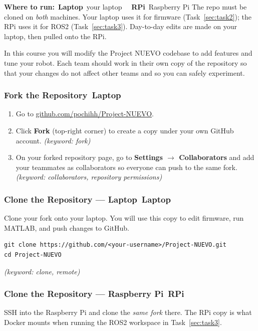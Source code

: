 \documentclass{ol-softwaremanual}
\newcommand{\onlaptop}{%
  \,\colorbox{green!25}{\footnotesize\sffamily\bfseries Laptop}}
\newcommand{\onrpi}{%
  \,\colorbox{blue!20}{\footnotesize\sffamily\bfseries RPi}}
\newcommand{\machinebox}[2]{%
  \par\noindent
  \colorbox{gray!12}{\parbox{\dimexpr\linewidth-2\fboxsep}{%
    \small\sffamily\textbf{Where to run:} #1 \quad\textbar\quad #2}}%
  \par\smallskip}
\newcommand{\doclink}[2]{\href{#1}{#2}}
\begin{document}
\machinebox{\onlaptop\ your laptop \textbar\ \onrpi\ Raspberry Pi}{The repo must be cloned on \emph{both} machines. Your laptop uses it for firmware (Task~\ref{sec:task2}); the RPi uses it for ROS2 (Task~\ref{sec:task3}). Day-to-day edits are made on your laptop, then pulled onto the RPi.}

In this course you will modify the Project NUEVO codebase to add features and
tune your robot.
Each team should work in their own copy of the repository so that your changes
do not affect other teams and so you can safely experiment.

\subsubsection{Fork the Repository\onlaptop}

\begin{enumerate}
  \item Go to \doclink{https://github.com/pochihh/Project-NUEVO}{github.com/pochihh/Project-NUEVO}.
  \item Click \textbf{Fork} (top-right corner) to create a copy under your own GitHub account.
    \hfill\textit{(keyword: fork)}
  \item On your forked repository page, go to \textbf{Settings $\to$ Collaborators}
        and add your teammates as collaborators so everyone can push to the same fork.
    \hfill\textit{(keyword: collaborators, repository permissions)}
\end{enumerate}

\subsubsection{Clone the Repository --- Laptop\onlaptop}

Clone your fork onto your laptop.
You will use this copy to edit firmware, run MATLAB, and push changes to GitHub.

\begin{verbatim}
git clone https://github.com/<your-username>/Project-NUEVO.git
cd Project-NUEVO
\end{verbatim}
\hfill\textit{(keyword: clone, remote)}

\subsubsection{Clone the Repository --- Raspberry Pi\onrpi}\label{ssec:clone-rpi}

SSH into the Raspberry Pi and clone the \emph{same fork} there.
The RPi copy is what Docker mounts when running the ROS2 workspace in Task~\ref{sec:task3}.
\end{document}
